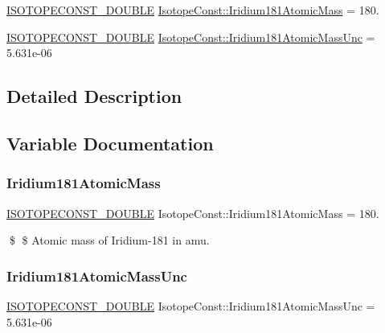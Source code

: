 \begin{DoxyCompactItemize}
\item 
\mbox{\hyperlink{group___isotope_const-_macros_ga8f45a7272ce02c0b4c65c44636ed719a}{I\+S\+O\+T\+O\+P\+E\+C\+O\+N\+S\+T\+\_\+\+D\+O\+U\+B\+LE}} \mbox{\hyperlink{group___isotope_const-_iridium-_ir181_ga3c450ca78510ef0fa71775acda355ad7}{Isotope\+Const\+::\+Iridium181\+Atomic\+Mass}} = 180.
\item 
\mbox{\hyperlink{group___isotope_const-_macros_ga8f45a7272ce02c0b4c65c44636ed719a}{I\+S\+O\+T\+O\+P\+E\+C\+O\+N\+S\+T\+\_\+\+D\+O\+U\+B\+LE}} \mbox{\hyperlink{group___isotope_const-_iridium-_ir181_gac686e15ca4c8b6cb96d87775ec4a33ef}{Isotope\+Const\+::\+Iridium181\+Atomic\+Mass\+Unc}} = 5.\+631e-\/06
\end{DoxyCompactItemize}


\subsection{Detailed Description}


\subsection{Variable Documentation}
\mbox{\label{group___isotope_const-_iridium-_ir181_ga3c450ca78510ef0fa71775acda355ad7}} 
\subsubsection{\texorpdfstring{Iridium181\+Atomic\+Mass}{Iridium181AtomicMass}}
{\footnotesize\ttfamily \mbox{\hyperlink{group___isotope_const-_macros_ga8f45a7272ce02c0b4c65c44636ed719a}{I\+S\+O\+T\+O\+P\+E\+C\+O\+N\+S\+T\+\_\+\+D\+O\+U\+B\+LE}} Isotope\+Const\+::\+Iridium181\+Atomic\+Mass = 180.}

\$ \$ Atomic mass of Iridium-\/181 in amu. \mbox{\label{group___isotope_const-_iridium-_ir181_gac686e15ca4c8b6cb96d87775ec4a33ef}} 
\subsubsection{\texorpdfstring{Iridium181\+Atomic\+Mass\+Unc}{Iridium181AtomicMassUnc}}
{\footnotesize\ttfamily \mbox{\hyperlink{group___isotope_const-_macros_ga8f45a7272ce02c0b4c65c44636ed719a}{I\+S\+O\+T\+O\+P\+E\+C\+O\+N\+S\+T\+\_\+\+D\+O\+U\+B\+LE}} Isotope\+Const\+::\+Iridium181\+Atomic\+Mass\+Unc = 5.\+631e-\/06}

